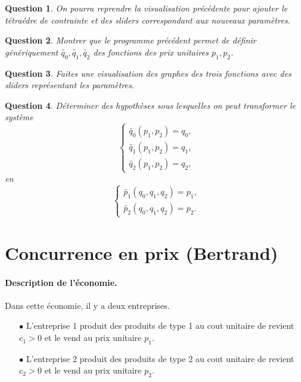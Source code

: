 \documentclass[11pt]{article}
\newtheorem{question}{Question}
\begin{document}
\begin{question}
    On pourra reprendre la visualisation précédente pour ajouter le tétraédre de contrainte et des sliders correspondant aux nouveaux paramètres.
\end{question}

\begin{question}
    Montrer que le programme précédent permet de définir génériquement $\tilde{q_0},\tilde{q_1}, \tilde{q_2}$ des fonctions des prix unitaires $p_1, p_2$.
\end{question}

\begin{question}
    Faites une visualisation des graphes des trois fonctions avec des sliders représentant les paramètres.
\end{question}

\begin{question}
    Déterminer des hypothèses sous lesquelles on peut transformer le système 
    \begin{equation} \label{eq:3}
        \begin{cases}
            \tilde{q_0}(p_1, p_2) = q_0,\\
            \tilde{q_1}(p_1, p_2) = q_1,\\
            \tilde{q_2}(p_1, p_2) = q_2,
        \end{cases}
    \end{equation}
    en 
    \begin{equation}
        \begin{cases}
            \tilde{p_1}(q_0, q_1, q_2)=p_1,\\
            \tilde{p_2}(q_0, q_1, q_2)=p_2.
        \end{cases}
    \end{equation}
\end{question}

\section{Concurrence en prix (Bertrand)}%
\label{sec:concurrence_en_prix}

\paragraph{Description de l'économie.} Dans cette économie, il y a deux entreprises.
\begin{itemize}
    \item[$\bullet$] L'entreprise 1 produit des produits de type 1 au cout unitaire de revient $c_1>0$ et le vend au prix unitaire $p_1$.
    \item[$\bullet$] L'entreprise 2 produit des produits de type 2 au cout unitaire de revient $c_2>0$ et le vend au prix unitaire $p_2$.
\end{itemize}
\end{document}

